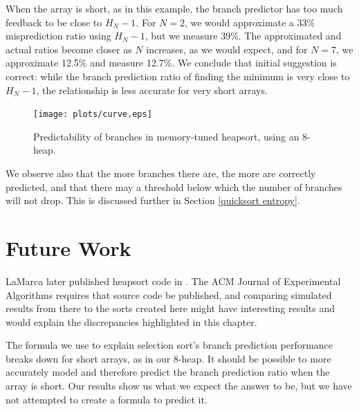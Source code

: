 When the array is short, as in this example, the branch predictor has too much
feedback to be close to $H_N-1$. For $N=2$, we would approximate a 33\%
misprediction ratio using $H_N-1$, but we measure 39\%. The approximated and
actual ratios become closer as $N$ increases, as we would expect, and for $N=7$,
we approximate 12.5\% and measure 12.7\%. We conclude that initial suggestion is
correct: while the branch prediction ratio of finding the minimum is very close
to $H_N-1$, the relationship is less accurate for very short arrays.


\begin{figure}
\texttt{[image: plots/curve.eps]}
\caption{Predictability of branches in memory-tuned heapsort, using an 8-heap.}
\label{memory-tuned heapsort curve}
\end{figure}

\label{heapsort entropy}
We observe also that the more branches there are, the more are correctly
predicted, and that there may a threshold below which the number of branches will
not drop. This is discussed further in Section \ref{quicksort entropy}.

\section{Future Work}

LaMarca later published heapsort code in \cite{LaMarcaHeap96}. The ACM
Journal of Experimental Algorithms requires that source code be published, and
comparing simulated results from there to the sorts created here might have
interesting results and would explain the discrepancies highlighted in this
chapter.

The formula we use to explain selection sort's branch prediction performance
breaks down for short arrays, as in our 8-heap. It should be possible to more
accurately model and therefore predict the branch prediction ratio when the
array is short. Our results show us what we expect the answer to be, but we have
not attempted to create a formula to predict it.
